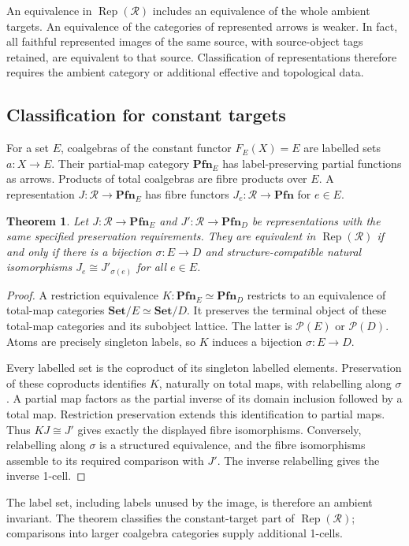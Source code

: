 \documentclass[11pt]{article}
\newtheorem{theorem}{Theorem}[section]
\theoremstyle{definition}
\newcommand{\R}{\mathcal R}
\newcommand{\Pfn}{\mathbf{Pfn}}
\newcommand{\Set}{\mathbf{Set}}
\newcommand{\Rep}{\operatorname{Rep}}
\begin{document}
An equivalence in $\Rep(\R)$ includes an equivalence of the whole
ambient targets. An equivalence of the categories of represented arrows
is weaker. In fact, all faithful represented images of the same source,
with source-object tags retained, are equivalent to that source.
Classification of representations therefore requires the ambient
category or additional effective and topological data.

\subsection{Classification for constant targets}
For a set $E$, coalgebras of the constant functor $F_E(X)=E$ are
labelled sets $a:X\to E$. Their partial-map category $\Pfn_E$ has
label-preserving partial functions as arrows. Products of total
coalgebras are fibre products over $E$. A representation
$J:\R\to\Pfn_E$ has fibre functors $J_e:\R\to\Pfn$ for $e\in E$.

\begin{theorem}\label{thm:constant}
Let $J:\R\to\Pfn_E$ and $J':\R\to\Pfn_D$ be representations with
the same specified preservation requirements. They are equivalent
in $\Rep(\R)$ if and only if there is a bijection $\sigma:E\to D$
and structure-compatible natural isomorphisms
$J_e\cong J'_{\sigma(e)}$ for all $e\in E$.
\end{theorem}
\begin{proof}
A restriction equivalence $K:\Pfn_E\simeq\Pfn_D$ restricts to an
equivalence of total-map categories $\Set/E\simeq\Set/D$.
It preserves the terminal object of these total-map categories and
its subobject lattice. The latter is $\mathcal P(E)$ or
$\mathcal P(D)$. Atoms are precisely singleton labels, so $K$
induces a bijection $\sigma:E\to D$.

Every labelled set is the coproduct of its singleton labelled elements.
Preservation of these coproducts identifies $K$, naturally on total
maps, with relabelling along $\sigma$. A partial map factors as the
partial inverse of its domain inclusion followed by a total map.
Restriction preservation extends this identification to partial maps.
Thus $KJ\cong J'$ gives exactly the displayed fibre isomorphisms.
Conversely, relabelling along $\sigma$ is a structured equivalence,
and the fibre isomorphisms assemble to its required comparison with
$J'$. The inverse relabelling gives the inverse 1-cell.
\end{proof}

The label set, including labels unused by the image, is therefore an
ambient invariant. The theorem classifies the constant-target part
of $\Rep(\R)$; comparisons into larger coalgebra categories supply
additional 1-cells.
\end{document}
